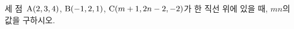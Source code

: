 세 점~$\mathrm{A}(2{,}\mkern3mu\mathopen{}3{,}\mkern3mu\mathopen{}4)$, $\mathrm{B}(-1{,}\mkern3mu\mathopen{}2{,}\mkern3mu\mathopen{}1)$, $\mathrm{C}(m+1{,}\mkern3mu\mathopen{}2n-2{,}\mkern3mu\mathopen{}-2)$가 한 직선 위에 있을 때, $mn$의 값을 구하시오.
